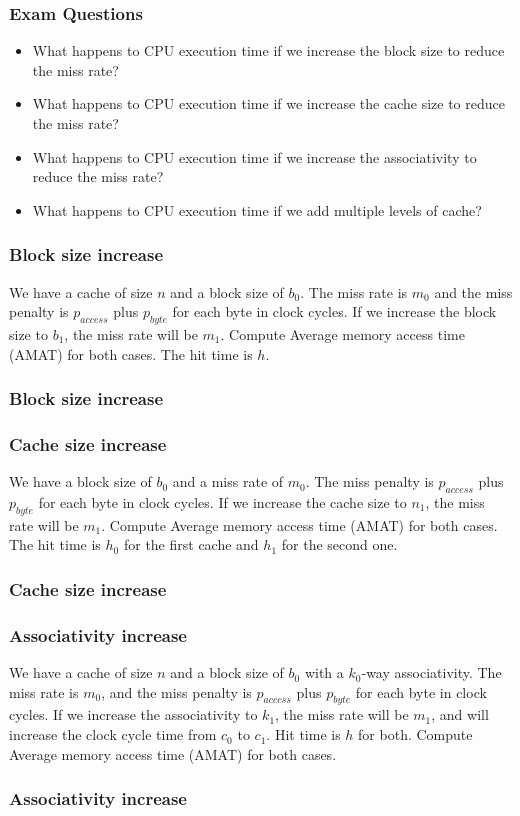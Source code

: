 \begin{frame}
    \frametitle{Exam Questions}
    \begin{itemize}
        \item What happens to CPU execution time if we increase the block size to reduce the miss rate?
        \item What happens to CPU execution time if we increase the cache size to reduce the miss rate?
        \item What happens to CPU execution time if we increase the associativity to reduce the miss rate?
        \item What happens to CPU execution time if we add multiple levels of cache?
    \end{itemize}
\end{frame}

\begin{frame}
    \frametitle{Block size increase}
    We have a cache of size $n$ and a block size of $b_{0}$.
    The miss rate is $m_{0}$ and the miss penalty is $p_{access}$ plus $p_{byte}$
    for each byte in clock cycles. If we increase the block size to $b_{1}$,
    the miss rate will be $m_{1}$. Compute Average memory access time (AMAT)
    for both cases. The hit time is $h$.
\end{frame}
\begin{frame}
    \frametitle{Block size increase}
\end{frame}


\begin{frame}
    \frametitle{Cache size increase}
    We have a block size of $b_{0}$ and a miss rate of $m_{0}$.
    The miss penalty is $p_{access}$ plus $p_{byte}$ for each byte in clock cycles.
    If we increase the cache size to $n_{1}$, the miss rate will be $m_{1}$.
    Compute Average memory access time (AMAT) for both cases.
    The hit time is $h_{0}$ for the first cache and $h_{1}$ for the second one.
\end{frame}
\begin{frame}
    \frametitle{Cache size increase}
\end{frame}

\begin{frame}
    \frametitle{Associativity increase}
    We have a cache of size $n$ and a block size of $b_{0}$ with a $k_{0}$-way associativity.
    The miss rate is $m_{0}$, and the miss penalty is $p_{access}$ plus $p_{byte}$ for
    each byte in clock cycles. If we increase the associativity to $k_{1}$,
    the miss rate will be $m_{1}$, and will increase the clock cycle time from $c_{0}$ to $c_{1}$.
    Hit time is $h$ for both. Compute Average memory access time (AMAT) for both cases.
\end{frame}
\begin{frame}
    \frametitle{Associativity increase}
\end{frame}

